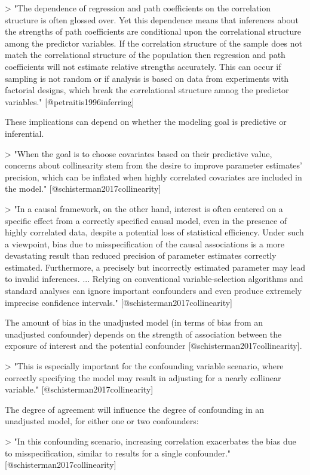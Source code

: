 > "The dependence of regression and path coefficients on the correlation
structure is often glossed over. Yet this dependence means that inferences about
the strengths of path coefficients are conditional upon the correlational
structure among the predictor variables. If the correlation structure of the
sample does not match the correlational structure of the population then
regression and path coefficients will not estimate relative strengths
accurately. This can occur if sampling is not random or if analysis is based on
data from experiments with factorial designs, which break the correlational
structure amnog the predictor variables." [@petraitis1996inferring]

These implications can depend on whether the modeling goal is predictive or 
inferential. 

> "When the goal is to choose covariates based on their predictive value, 
concerns about collinearity stem from the desire to improve parameter estimates'
precision, which can be inflated when highly correlated covariates are included
in the model." [@schisterman2017collinearity]

> "In a causal framework, on the other hand, interest is often centered on a
specific effect from a correctly specified causal model, even in the presence of
highly correlated data, despite a potential loss of statistical efficiency.
Under such a viewpoint, bias due to misspecification of the causal associations
is a more devastating result than reduced precision of parameter estimates
correctly estimated. Furthermore, a precisely but incorrectly estimated
parameter may lead to invalid inferences. ... Relying on conventional
variable-selection algorithms and standard analyses can ignore important
confounders and even produce extremely imprecise confidence intervals."
[@schisterman2017collinearity]

The amount of bias in the unadjusted model (in terms of bias from an unadjusted
confounder) depends on the strength of association between the exposure of
interest and the potential confounder [@schisterman2017collinearity].

> "This is especially important for the confounding variable scenario, where 
correctly specifying the model may result in adjusting for a nearly 
collinear variable." [@schisterman2017collinearity]

The degree of agreement will influence the degree of confounding in an 
unadjusted model, for either one or two confounders: 

> "In this confounding scenario, increasing correlation exacerbates the bias
due to misspecification, similar to results for a single confounder."
[@schisterman2017collinearity]

